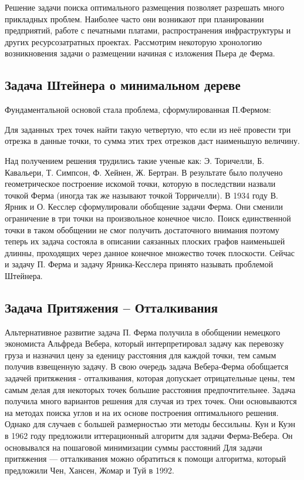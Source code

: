 \tab Решение задачи поиска оптимального размещения позволяет разрешать много прикладных проблем. Наиболее часто они возникают при планировании предприятий, работе с печатными платами, распространения инфраструктуры и других ресурсозатратных проектах.
\tab Рассмотрим некоторую хронологию возникновения задачи о размещении начиная с изложения Пьера де Ферма.
\subsection{Задача Штейнера о минимальном дереве}
\tab Фундаментальной основой стала проблема, сформулированная П.Фермом:
\begin{displayquote}
    \begin{center}
        Для заданных трех точек найти такую четвертую, что если из неё провести три отрезка в данные точки, то сумма этих трех отрезков даст наименьшую величину.
    \end{center}
\end{displayquote}
\tab Над получением решения трудились такие ученые как: Э. Торичелли, Б. Кавальери, Т. Симпсон, Ф. Хейнен, Ж. Бертран. В результате было получено геометрическое построение искомой точки, которую в последствии назвали точкой Ферма (иногда так же называют точкой Торричелли). 
\newline
\tab В 1934 году В. Ярник и О. Кесслер сформулировали обобщение задачи Ферма. Они сменили ограничение в три точки на произвольное конечное число. Поиск единственной точки в таком обобщении не смог получить достаточного внимания поэтому теперь их задача состояла в описании саязанных плоских графов наименьшей длинны, проходящих через данное конечное множество точек плоскости.  \cite{courant1941mathematics}
\newline
\tab Сейчас и задачу П. Ферма и задачу Ярника-Кесслера принято называть проблемой Штейнера. 

\subsection{Задача Притяжения – Отталкивания}
\tab Альтернативное развитие задача П. Ферма получила в обобщении немецкого экономиста Альфреда Вебера, который интерпретировал задачу как перевозку груза и назначил цену за еденицу расстояния для каждой точки, тем самым получив взвещенную задачу.
\newline
\tab В свою очередь задача Вебера-Ферма обобщается задачей притяжения - отталкивания, которая допускает отрицательные цены, тем самым делая для некоторых точек большие расстояния предпочтительнее. 
\newline
\tab Задача получила много вариантов решения для случая из трех точек. Они основываются на методах поиска углов и на их основе построения оптимального решения. Однако для случаев с большей размерностью эти методы бессильны. 
\newline
\tab Кун и Куэн в 1962 году предложили иттерационный алгоритм для задачи Ферма-Вебера. Он основывался на пошаговой минимизации суммы расстояний
\newline
\tab  Для задачи притяжения — отталкивания можно обратиться к помощи алгоритма, который предложили Чен, Хансен, Жомар и Туй в 1992.  
\newpage